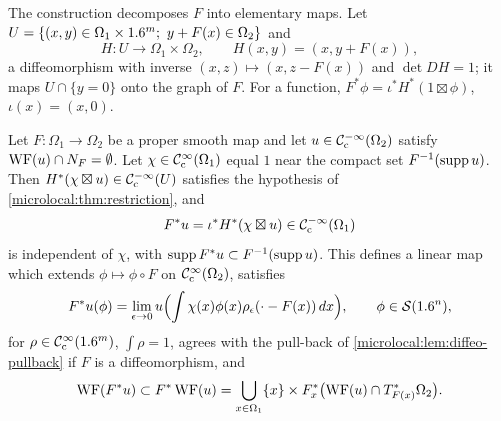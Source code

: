 The construction decomposes $F$ into elementary maps. Let
$U=\{(x,y)\in\Omega_1\times\R^m;\ y+F(x)\in\Omega_2\}$ and
\begin{equation*}
  H:U\to\Omega_1\times\Omega_2,\qquad H(x,y)=(x,y+F(x)),
\end{equation*}
a diffeomorphism with inverse $(x,z)\mapsto(x,z-F(x))$ and $\det DH=1$; it
maps $U\cap\{y=0\}$ onto the graph of $F$. For a function,
$F^*\phi=\iota^*H^*(1\boxtimes\phi)$, $\iota(x)=(x,0)$.

\begin{theorem}\label{microlocal:thm:pullback}
  Let $F:\Omega_1\to\Omega_2$ be a proper smooth map and let
  $u\in\mathcal{C}^{-\infty}_{\mathrm{c}}(\Omega_2)$ satisfy $\operatorname{WF}(u)\cap N_F=\emptyset$. Let
  $\chi\in\mathcal{C}^\infty_{\mathrm{c}}(\Omega_1)$ equal $1$ near the compact set $F^{-1}(\operatorname{supp} u)$.
  Then $H^*(\chi\boxtimes u)\in\mathcal{C}^{-\infty}_{\mathrm{c}}(U)$ satisfies the hypothesis of
  \cref{microlocal:thm:restriction}, and
  \begin{equation*}
    F^*u=\iota^*H^*(\chi\boxtimes u)\in\mathcal{C}^{-\infty}_{\mathrm{c}}(\Omega_1)
  \end{equation*}
  is independent of $\chi$, with $\operatorname{supp} F^*u\subset F^{-1}(\operatorname{supp} u)$. This
  defines a linear map which extends $\phi\mapsto\phi\circ F$ on
  $\mathcal{C}^\infty_{\mathrm{c}}(\Omega_2)$, satisfies
  \begin{equation*}
    F^*u(\phi)=\lim_{\epsilon\to0}u\Bigl(\int\chi(x)\phi(x)\rho_\epsilon(\cdot-F(x))\,dx\Bigr),
    \qquad\phi\in\mathcal{S}(1.6^n),
  \end{equation*}
  for $\rho\in\mathcal{C}^\infty_{\mathrm{c}}(1.6^m)$, $\int\rho=1$, agrees with the pull-back of
  \cref{microlocal:lem:diffeo-pullback} if $F$ is a diffeomorphism, and
  \begin{equation*}
    \operatorname{WF}(F^*u)\subset F^*\operatorname{WF}(u)=\bigcup_{x\in\Omega_1}
    \{x\}\times F_x^*\bigl(\operatorname{WF}(u)\cap T^*_{F(x)}\Omega_2\bigr).
  \end{equation*}
\end{theorem}
